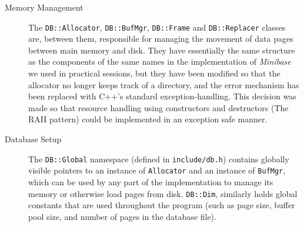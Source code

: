 \begin{description}
  \item[Memory Management]
    The \texttt{DB::Allocator}, \texttt{DB::BufMgr}, \texttt{DB::Frame} and \texttt{DB::Replacer} classes are, between them, responsible for managing the movement of data pages between main memory and disk. They have essentially the same structure as the components of the same names in the implementation of \textit{Minibase} we used in practical sessions, but they have been modified so that the allocator no longer keeps track of a directory, and the error mechanism has been replaced with C++'s standard exception-handling. This decision was made so that resource handling using constructors and destructors (The RAII pattern) could be implemented in an exception safe manner.

  \item[Database Setup]
    The \texttt{DB::Global} namespace (defined in \texttt{include/db.h}) contains globally visible pointers to an instance of \texttt{Allocator} and an instance of \texttt{BufMgr}, which can be used by any part of the implementation to manage its memory or otherwise load pages from disk. \texttt{DB::Dim}, similarly holds global constants that are used throughout the program (such as page size, buffer pool size, and number of pages in the database file).


\end{description}
